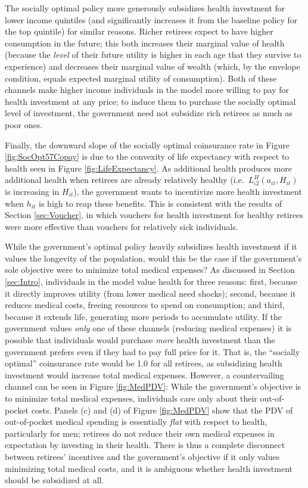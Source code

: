 \documentclass[12pt,pdftex,letterpaper]{article}
\newcommand{\Type}{\iota}
\newcommand{\Health}{h}
\newcommand{\PostHealth}{H}
\newcommand{\Assets}{a}
\begin{document}
The socially optimal policy more generously subsidizes health investment for lower income quintiles (and significantly increases it from the baseline policy for the top quintile) for similar reasons.  Richer retirees expect to have higher consumption in the future; this both increases their marginal value of health (because the \textit{level} of their future utility is higher in each age that they survive to experience) and decreases their marginal value of wealth (which, by the envelope condition, equals expected marginal utility of consumption).  Both of these channels make higher income individuals in the model more willing to pay for health investment at any price; to induce them to purchase the socially optimal level of investment, the government need not subsidize rich retirees as much as poor ones.

Finally, the downward slope of the socially optimal coinsurance rate in Figure \ref{fig:SocOpt57Copay} is due to the convexity of life expectancy with respect to health seen in Figure \ref{fig:LifeExpectancy}.  As additional health produces more additional health when retirees are already relatively healthy (i.e.\ $L^\PostHealth_{\Type 2}(\Assets_{it},\PostHealth_{it})$ is increasing in $\PostHealth_{it}$), the government wants to incentivize more health investment when $\Health_{it}$ is high to reap these benefits.  This is consistent with the results of Section \ref{sec:Voucher}, in which vouchers for health investment for healthy retirees were more effective than vouchers for relatively sick individuals.

While the government's optimal policy heavily subsidizes health investment if it values the longevity of the population, would this be the case if the government's sole objective were to minimize total medical expenses?  As discussed in Section \ref{sec:Intro}, individuals in the model value health for three reasons: first, because it directly improves utility (from lower medical need shocks); second, because it reduces medical costs, freeing resources to spend on consumption; and third, because it extends life, generating more periods to accumulate utility.  If the government values \textit{only} one of these channels (reducing medical expenses) it is possible that individuals would purchase \textit{more} health investment than the government prefers even if they had to pay full price for it.  That is, the ``socially optimal'' coinsurance rate would be 1.0 for all retirees, as subsidizing health investment would increase total medical expenses.  However, a countervailing channel can be seen in Figure \ref{fig:MedPDV}: While the government's objective is to minimize total medical expenses, individuals care only about their out-of-pocket costs.  Panels (c) and (d) of Figure \ref{fig:MedPDV} show that the PDV of out-of-pocket medical spending is essentially \textit{flat} with respect to health, particularly for men; retirees do not reduce their own medical expenses in expectation by investing in their health.  There is thus a complete disconnect between retirees' incentives and the government's objective if it only values minimizing total medical costs, and it is ambiguous whether health investment should be subsidized at all.
\end{document}
